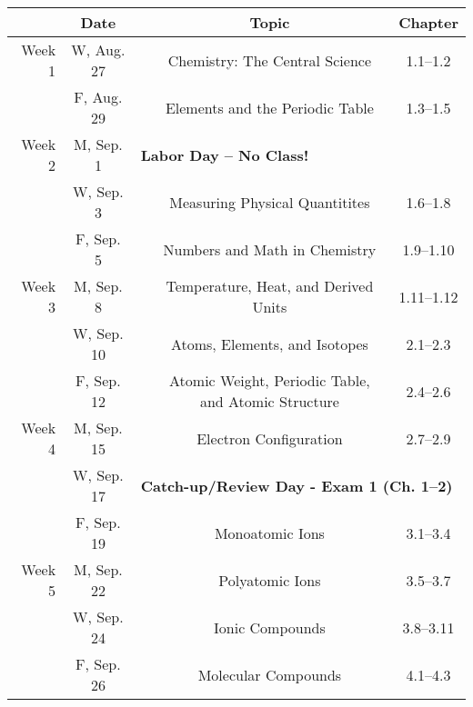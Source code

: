\documentclass[12pt, letterpaper]{article}
\begin{document}
\noindent
\begin{tabular}{rcccc}
& Date && Topic & Chapter\\
\midrule
Week 1 & W, Aug. 27&& Chemistry: The Central Science & 1.1--1.2\\
& F, Aug. 29&& Elements and the Periodic Table & 1.3--1.5\\
\midrule
Week 2 & M, Sep. 1& \multicolumn{3}{l}{\textbf{Labor Day -- No Class!}}\\
& W, Sep. 3&& Measuring Physical Quantitites & 1.6--1.8\\
& F, Sep. 5&& Numbers and Math in Chemistry & 1.9--1.10\\
\midrule
Week 3 & M, Sep. 8&& Temperature, Heat, and Derived Units & 1.11--1.12\\
& W, Sep. 10&& Atoms, Elements, and Isotopes & 2.1--2.3\\
& F, Sep. 12&& Atomic Weight, Periodic Table, and Atomic Structure & 2.4--2.6\\
\midrule
Week 4 & M, Sep. 15&& Electron Configuration & 2.7--2.9\\
& W, Sep. 17& \multicolumn{3}{l}{\textbf{Catch-up/Review Day - Exam 1 (Ch. 1--2)}}\\
& F, Sep. 19&& Monoatomic Ions & 3.1--3.4\\
\midrule
Week 5 & M, Sep. 22&& Polyatomic Ions & 3.5--3.7\\
& W, Sep. 24&& Ionic Compounds & 3.8--3.11\\
& F, Sep. 26&& Molecular Compounds & 4.1--4.3\\
\end{tabular}
\end{document}
